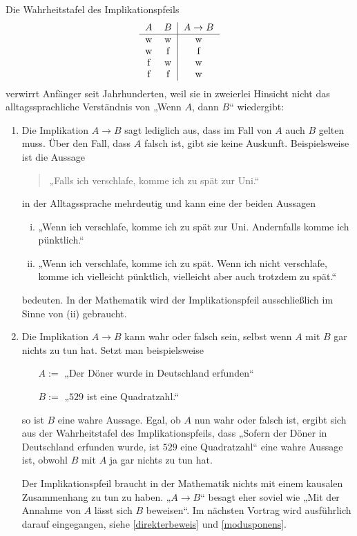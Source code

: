 \begin{bem}
    Die Wahrheitstafel des Implikationspfeils
    \[\begin{tabular}{cc|c}
        $A$ & $B$ &  $A\to B$  \\
        \hline
        w&w& w\\
        w&f& f\\
        f&w& w\\
        f&f& w\\
    \end{tabular}\]
    verwirrt Anfänger seit Jahrhunderten, weil sie in zweierlei Hinsicht nicht das alltagssprachliche Verständnis von „Wenn $A$, dann $B$“ wiedergibt:
    \begin{enumerate}[1.]
        \item Die Implikation $A\to B$ sagt lediglich aus, dass im Fall von $A$ auch $B$ gelten muss. Über den Fall, dass $A$ falsch ist, gibt sie keine Auskunft. Beispielsweise ist die Aussage
        \begin{quote}
            „Falls ich verschlafe, komme ich zu spät zur Uni.“
        \end{quote}
        in der Alltagssprache mehrdeutig und kann eine der beiden Aussagen
        \begin{enumerate}[(i)]
            \item „Wenn ich verschlafe, komme ich zu spät zur Uni. Andernfalls komme ich pünktlich.“
            \item „Wenn ich verschlafe, komme ich zu spät. Wenn ich nicht verschlafe, komme ich vielleicht pünktlich, vielleicht aber auch trotzdem zu spät.“
        \end{enumerate}
        bedeuten. In der Mathematik wird der Implikationspfeil ausschließlich im Sinne von (ii) gebraucht.
        \item Die Implikation $A\to B$ kann wahr oder falsch sein, selbst wenn $A$ mit $B$ gar nichts zu tun hat. Setzt man beispielsweise
        \begin{itemize}[labelindent=3em, leftmargin=!, labelwidth=]
            \item[$A:=$] „Der Döner wurde in Deutschland erfunden“
            \item[$B:=$] „$529$ ist eine Quadratzahl.“
        \end{itemize}
        so ist $B$ eine wahre Aussage. Egal, ob $A$ nun wahr oder falsch ist, ergibt sich aus der Wahrheitstafel des Implikationspfeils, dass „Sofern der Döner in Deutschland erfunden wurde, ist $529$ eine Quadratzahl“ eine wahre Aussage ist, obwohl $B$ mit $A$ ja gar nichts zu tun hat.

        Der Implikationspfeil braucht in der Mathematik nichts mit einem kausalen Zusammenhang zu tun zu haben. „$A\to B$“ besagt eher soviel wie „Mit der Annahme von $A$ lässt sich $B$ beweisen“. Im nächsten Vortrag wird ausführlich darauf eingegangen, siehe \cref{direkterbeweis} und \cref{modusponens}.
    \end{enumerate}
\end{bem}






